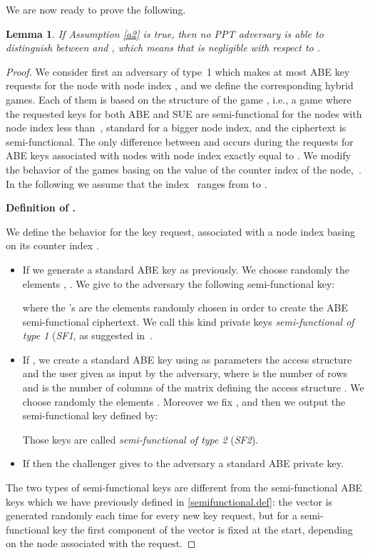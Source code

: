 \documentclass[a4paper,10pt]{article}
\newtheorem{lemma}{Lemma}
\newcommand{\ith}{\text{-th}}
\newcommand{\randomchoose}[1]{We choose randomly the element\ifstrequal{#1}{s}{}{s} }
\newcommand{\game}[2]{}
\newcommand{\gamedef}[3]{
\textbf{Definition of \game{#1}{#2}.}
#3}
\newcommand{\sfone}{SF1}
\newcommand{\sftwo}{SF2}
\newcommand{\typeone}{type~1}
\begin{document}
	We are now ready to prove the following.
	
	\begin{lemma}
		\label{lemma.g1h}
		If Assumption \ref{a2} is true, then no PPT adversary  is able to distinguish between \game{G}{1,h-1} and \game{G}{1,h}, which means that  is negligible with respect to .
	\end{lemma}
	\begin{proof}
		We consider first an adversary of \typeone{} which makes at most  ABE key requests for the node with node index , and we define the corresponding hybrid games. Each of them is based on the structure of the game \game{G}{1,h-1}, i.e., a game where the requested keys for both ABE and SUE are semi-functional for the nodes with node index less than~, standard for a bigger node index, and the ciphertext is semi-functional. The only difference between \game{G}{1,h-1} and \game{G}{1,h} occurs during the requests for ABE keys associated with nodes with node index exactly equal to . We modify the behavior of the games basing on the value of the counter index of the node,~. In the following we assume that the index~ ranges from  to .
		
		\gamedef{H}{k,1}{
		We define the behavior for the \ith{} key request, associated with a node index  basing on its counter index .
		
		\begin{itemize}
			\item
			If  we generate a standard ABE key  as previously.
			\randomchoose{p}{,
				.
			}
			We give to the adversary the following semi-functional key:
			
			where the 's are the elements randomly chosen in order to create the ABE semi-functional ciphertext.
			We call this kind private keys \emph{semi-functional of type 1} (\emph{\sfone}, as suggested in~\cite{lewko2010ABE}.
			
			\item
			If , we create a standard ABE key  using as parameters the access structure  and the user  given as input by the adversary, where  is the number of rows and  is the number of columns of the matrix  defining the access structure .
			\randomchoose{p}{.
			}
			Moreover we fix , and then we output the semi-functional key defined by:
			
			Those keys are called \emph{semi-functional of type 2} (\emph{\sftwo}).
			
			\item
			If  then the challenger gives to the adversary a standard ABE private key.
		\end{itemize}
		The two types of semi-functional keys are different from the semi-functional ABE keys which we have previously defined in \ref{semifunctional.def}: the vector  is generated randomly each time for every new key request, but for a semi-functional key the first component of the vector is fixed at the start, depending on the node associated with the request.
		}
		

\end{proof}
\end{document}
